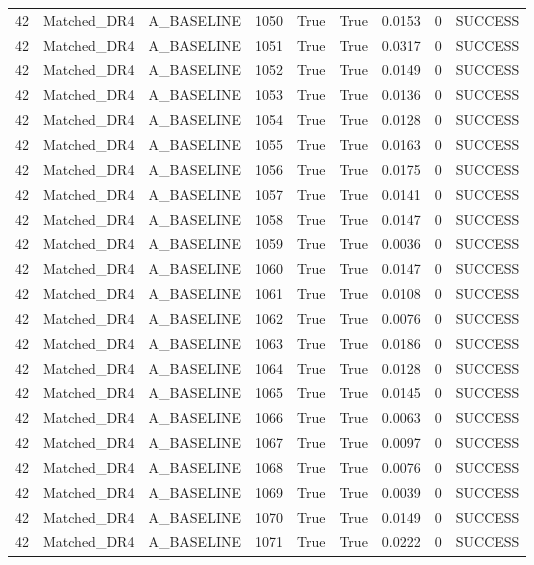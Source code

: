 \documentclass[11pt,a4paper,oneside]{book}
\begin{document}
\begin{longtable}{l l l l l l l l l}
42 & Matched\_DR4 & A\_BASELINE & 1050 & True & True & 0.0153 & 0 & SUCCESS \\
42 & Matched\_DR4 & A\_BASELINE & 1051 & True & True & 0.0317 & 0 & SUCCESS \\
42 & Matched\_DR4 & A\_BASELINE & 1052 & True & True & 0.0149 & 0 & SUCCESS \\
42 & Matched\_DR4 & A\_BASELINE & 1053 & True & True & 0.0136 & 0 & SUCCESS \\
42 & Matched\_DR4 & A\_BASELINE & 1054 & True & True & 0.0128 & 0 & SUCCESS \\
42 & Matched\_DR4 & A\_BASELINE & 1055 & True & True & 0.0163 & 0 & SUCCESS \\
42 & Matched\_DR4 & A\_BASELINE & 1056 & True & True & 0.0175 & 0 & SUCCESS \\
42 & Matched\_DR4 & A\_BASELINE & 1057 & True & True & 0.0141 & 0 & SUCCESS \\
42 & Matched\_DR4 & A\_BASELINE & 1058 & True & True & 0.0147 & 0 & SUCCESS \\
42 & Matched\_DR4 & A\_BASELINE & 1059 & True & True & 0.0036 & 0 & SUCCESS \\
42 & Matched\_DR4 & A\_BASELINE & 1060 & True & True & 0.0147 & 0 & SUCCESS \\
42 & Matched\_DR4 & A\_BASELINE & 1061 & True & True & 0.0108 & 0 & SUCCESS \\
42 & Matched\_DR4 & A\_BASELINE & 1062 & True & True & 0.0076 & 0 & SUCCESS \\
42 & Matched\_DR4 & A\_BASELINE & 1063 & True & True & 0.0186 & 0 & SUCCESS \\
42 & Matched\_DR4 & A\_BASELINE & 1064 & True & True & 0.0128 & 0 & SUCCESS \\
42 & Matched\_DR4 & A\_BASELINE & 1065 & True & True & 0.0145 & 0 & SUCCESS \\
42 & Matched\_DR4 & A\_BASELINE & 1066 & True & True & 0.0063 & 0 & SUCCESS \\
42 & Matched\_DR4 & A\_BASELINE & 1067 & True & True & 0.0097 & 0 & SUCCESS \\
42 & Matched\_DR4 & A\_BASELINE & 1068 & True & True & 0.0076 & 0 & SUCCESS \\
42 & Matched\_DR4 & A\_BASELINE & 1069 & True & True & 0.0039 & 0 & SUCCESS \\
42 & Matched\_DR4 & A\_BASELINE & 1070 & True & True & 0.0149 & 0 & SUCCESS \\
42 & Matched\_DR4 & A\_BASELINE & 1071 & True & True & 0.0222 & 0 & SUCCESS \\

\end{longtable}
\end{document}

